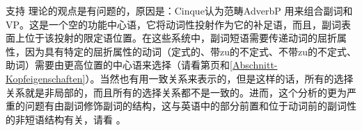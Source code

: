 支持 \citet{Cinque99a-u}理论的观点是有问题的，原因是：Cinque认为范畴AdverbP
用来组合副词和VP。这是一个空的功能中心语，它将动词性投射作为它的补足语，而且，副词表面上位于该投射的限定语位置。在这些系统中，副词短语需要传递动词的屈折属性，因为具有特定的屈折属性的动词（定式的、带zu的不定式、不带zu的不定式、助词）需要由更高位置的中心语来选择（请看第\pageref{Beispiel-GPSG-Kopfeigenschaften}页和\ref{Abschnitt-Kopfeigenschaften}）。当然也有用一致关系来表示的，但是这样的话，所有的选择关系就是非局部的，而且所有的选择关系都不是一致的。进而，这个分析的更为严重的问题有由副词修饰副词的结构，这与英语中的部分前置和位于动词前的副词性的非短语结构有关，请看 。

